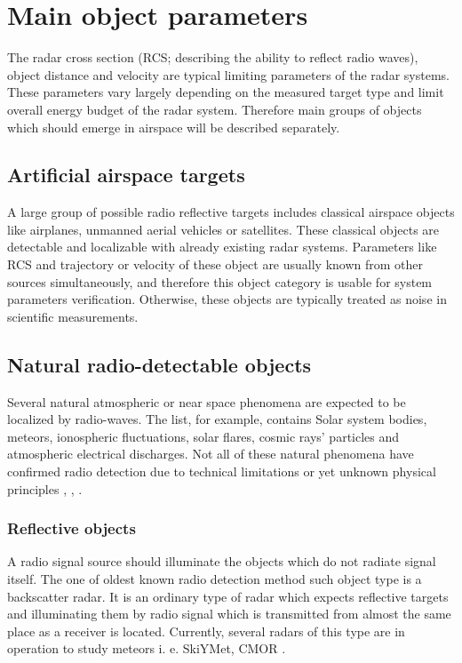 \documentclass[twoside]{ctuthesis}
\theoremstyle{plain}
\theoremstyle{definition}
\theoremstyle{note}
\begin{document}
\section{Main object parameters}

The radar cross section (RCS; describing the ability to reflect radio waves), object distance and velocity are typical limiting parameters of the radar systems. These parameters vary largely depending on the measured target type and limit overall energy budget of the radar system. Therefore main groups of objects which should emerge in airspace will be described separately. 

\subsection{Artificial airspace targets}

A large group of possible radio reflective targets includes classical airspace objects like airplanes, unmanned aerial vehicles or satellites. These classical objects are detectable and localizable with already existing radar systems. Parameters like RCS and trajectory or velocity of these object are usually known from other sources simultaneously, and therefore this object category is usable for system parameters verification. Otherwise, these objects are typically treated as noise in scientific measurements. 

\subsection{Natural radio-detectable objects}

Several natural atmospheric or near space phenomena are expected to be localized by radio-waves. The list, for example, contains Solar system bodies, meteors, ionospheric fluctuations, solar flares, cosmic rays' particles and atmospheric electrical discharges. Not all of these natural phenomena have confirmed radio detection due to technical limitations or yet unknown physical principles \cite{LOPES}, \cite{astro_particles}, \cite{LOFAR_showers}.

\subsubsection{Reflective objects}
A radio signal source should illuminate the objects which do not radiate signal itself. 
The one of oldest known radio detection method such object type is a backscatter radar. It is an ordinary type of radar which expects reflective targets and illuminating them by radio signal which is transmitted from almost the same place as a receiver is located. Currently, several radars of this type are in operation to study meteors i. e.  SkiYMet\cite{skiymet}, CMOR \cite{CMOR_radar}.
\end{document}
